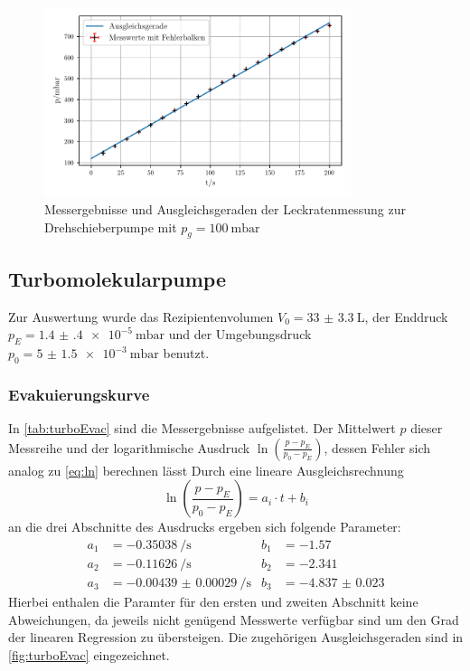     \begin{figure}
        \centering
        \includegraphics[width=0.8\textwidth]{abb/dreh_leck100.pdf}
        \caption{Messergebnisse und Ausgleichsgeraden der Leckratenmessung zur Drehschieberpumpe mit $p_g = \qty{100}{\milli\bar}$}
        \label{fig:drehLeck100}
    \end{figure}
    
\newpage
\subsection{Turbomolekularpumpe}
    Zur Auswertung wurde das Rezipientenvolumen $V_0 = \SI{33(3.3)}{\liter}$\cite{sample}, der Enddruck $p_E = \qty{1.4(4)e-5}{\milli\bar}$
    und der Umgebungsdruck $p_0 = \qty{5(1.5)e-3}{\milli\bar}$ benutzt.

    \subsubsection{Evakuierungskurve}

    In \autoref{tab:turboEvac} sind die Messergebnisse aufgelistet. Der Mittelwert $p$ dieser Messreihe und der logarithmische Ausdruck
    $\ln\left(\frac{p-p_E}{p_0-p_E}\right)$, dessen Fehler sich analog zu \autoref{eq:ln} berechnen lässt
    Durch eine lineare Ausgleichsrechnung 
    \begin{equation*}
        \ln\left(\frac{p-p_E}{p_0-p_E}\right) = a_i \cdot t + b_i
    \end{equation*}
    an die drei Abschnitte des Ausdrucks ergeben sich folgende Parameter:
    \begin{align*}
        a_1 &= \qty{-0.35038}{\per\second} & b_1 &= \num{-1.57} \\
        a_2 &= \qty{-0.11626}{\per\second} & b_2 &= \num{-2.341} \\
        a_3 &= \qty{-0.00439(29)}{\per\second} & b_3 &= \num{-4.837(23)}
    \end{align*}
    Hierbei enthalen die Paramter für den ersten und zweiten Abschnitt keine Abweichungen, da jeweils nicht genügend Messwerte verfügbar sind um den Grad der
    linearen Regression zu übersteigen.
    Die zugehörigen Ausgleichsgeraden sind in \autoref{fig:turboEvac} eingezeichnet.

